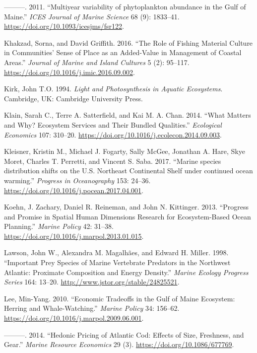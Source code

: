 \documentclass[
]{book}
\begin{document}
\leavevmode\hypertarget{ref-Kane2011}{}%
---------. 2011. ``Multiyear variability of phytoplankton abundance in the Gulf of Maine.'' \emph{ICES Journal of Marine Science} 68 (9): 1833--41. \url{https://doi.org/10.1093/icesjms/fsr122}.

\leavevmode\hypertarget{ref-khakzad_role_2016}{}%
Khakzad, Sorna, and David Griffith. 2016. ``The Role of Fishing Material Culture in Communities' Sense of Place as an Added-Value in Management of Coastal Areas.'' \emph{Journal of Marine and Island Cultures} 5 (2): 95--117. \url{https://doi.org/10.1016/j.imic.2016.09.002}.

\leavevmode\hypertarget{ref-SOE6}{}%
Kirk, John T.O. 1994. \emph{Light and Photosynthesis in Aquatic Ecosystems}. Cambridge, UK: Cambridge University Press.

\leavevmode\hypertarget{ref-klain_what_2014}{}%
Klain, Sarah C., Terre A. Satterfield, and Kai M. A. Chan. 2014. ``What Matters and Why? Ecosystem Services and Their Bundled Qualities.'' \emph{Ecological Economics} 107: 310--20. \url{https://doi.org/10.1016/j.ecolecon.2014.09.003}.

\leavevmode\hypertarget{ref-Kleisner2017}{}%
Kleisner, Kristin M., Michael J. Fogarty, Sally McGee, Jonathan A. Hare, Skye Moret, Charles T. Perretti, and Vincent S. Saba. 2017. ``Marine species distribution shifts on the U.S. Northeast Continental Shelf under continued ocean warming.'' \emph{Progress in Oceanography} 153: 24--36. \url{https://doi.org/10.1016/j.pocean.2017.04.001}.

\leavevmode\hypertarget{ref-koehn_progress_2013}{}%
Koehn, J. Zachary, Daniel R. Reineman, and John N. Kittinger. 2013. ``Progress and Promise in Spatial Human Dimensions Research for Ecosystem-Based Ocean Planning.'' \emph{Marine Policy} 42: 31--38. \url{https://doi.org/10.1016/j.marpol.2013.01.015}.

\leavevmode\hypertarget{ref-lawson1998}{}%
Lawson, John W., Alexandra M. Magalhães, and Edward H. Miller. 1998. ``Important Prey Species of Marine Vertebrate Predators in the Northwest Atlantic: Proximate Composition and Energy Density.'' \emph{Marine Ecology Progress Series} 164: 13--20. \url{http://www.jstor.org/stable/24825521}.

\leavevmode\hypertarget{ref-lee_economic_2010}{}%
Lee, Min-Yang. 2010. ``Economic Tradeoffs in the Gulf of Maine Ecosystem: Herring and Whale-Watching.'' \emph{Marine Policy} 34: 156--62. \url{https://doi.org/10.1016/j.marpol.2009.06.001}.

\leavevmode\hypertarget{ref-lee_hedonic_2014}{}%
---------. 2014. ``Hedonic Pricing of Atlantic Cod: Effects of Size, Freshness, and Gear.'' \emph{Marine Resource Economics} 29 (3). \url{https://doi.org/10.1086/677769}.
\end{document}
